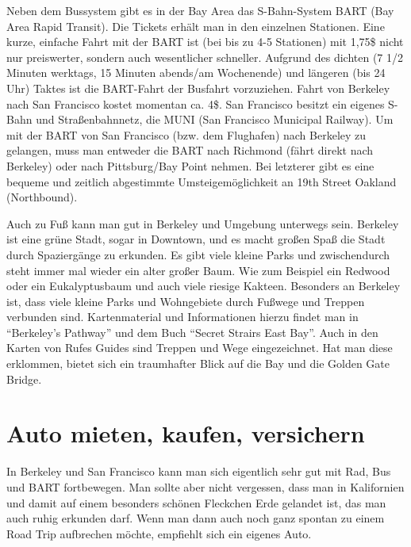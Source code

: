 \documentclass[a4paper]{scrreprt}
\begin{document}
Neben dem Bussystem gibt es in der Bay Area das S-Bahn-System BART
(Bay Area Rapid Transit). Die Tickets erhält man in den einzelnen
Stationen. Eine kurze, einfache Fahrt mit der BART ist (bei bis zu 4-5
Stationen) mit 1,75\$ nicht nur preiswerter, sondern auch
wesentlicher schneller. Aufgrund des dichten (7 1/2 Minuten werktags,
15 Minuten abends/am Wochenende) und längeren (bis 24 Uhr) Taktes ist
die BART-Fahrt der Busfahrt vorzuziehen. Fahrt von Berkeley nach San
Francisco kostet momentan ca. 4\$. San Francisco besitzt ein eigenes
S-Bahn und Straßenbahnnetz, die MUNI (San Francisco Municipal
Railway). Um mit der BART von San Francisco (bzw. dem Flughafen) nach
Berkeley zu gelangen, muss man entweder die BART nach Richmond (fährt
direkt nach Berkeley) oder nach Pittsburg/Bay Point nehmen. Bei
letzterer gibt es eine bequeme und zeitlich abgestimmte
Umsteigemöglichkeit an 19th Street Oakland (Northbound).

Auch zu Fuß kann man gut in Berkeley und Umgebung
unterwegs sein. Berkeley ist eine grüne Stadt, sogar in Downtown, und
es macht großen Spaß die Stadt durch  
Spaziergänge zu erkunden. Es gibt viele kleine Parks und
zwischendurch steht immer mal wieder ein alter großer Baum. Wie
zum Beispiel ein Redwood oder ein Eukalyptusbaum und auch viele
riesige Kakteen. %
Besonders an Berkeley ist, dass viele kleine Parks und Wohngebiete
durch Fußwege und Treppen verbunden sind. Kartenmaterial und
Informationen hierzu findet man in ``Berkeley's Pathway'' und dem
Buch ``Secret Strairs East Bay''. Auch in den Karten von Rufes Guides
sind Treppen und Wege eingezeichnet. Hat man diese erklommen, bietet
sich ein traumhafter Blick auf die Bay und die Golden Gate
Bridge.

\section{Auto mieten, kaufen, versichern}

In Berkeley und San Francisco kann man sich eigentlich sehr gut mit Rad, Bus und BART fortbewegen. Man sollte aber nicht vergessen, dass man in Kalifornien und damit auf einem besonders schönen Fleckchen Erde gelandet ist, das man auch ruhig erkunden darf. Wenn man dann auch noch ganz spontan zu einem Road Trip aufbrechen möchte, empfiehlt sich ein eigenes Auto.
\end{document}
